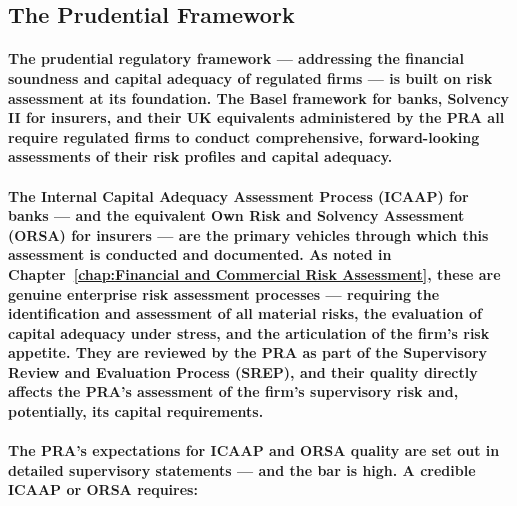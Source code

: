 \subsection{The Prudential Framework}
\paragraph{The \textbf{prudential regulatory framework} — addressing the financial soundness and capital adequacy of regulated firms — is built on risk assessment at its foundation. The Basel framework for banks, Solvency II for insurers, and their UK equivalents administered by the PRA all require regulated firms to conduct comprehensive, forward-looking assessments of their risk profiles and capital adequacy.}
\paragraph{The \textbf{Internal Capital Adequacy Assessment Process (ICAAP)} for banks — and the equivalent \textbf{Own Risk and Solvency Assessment (ORSA)} for insurers — are the primary vehicles through which this assessment is conducted and documented. As noted in Chapter~\ref{chap:Financial and Commercial Risk Assessment}, these are genuine enterprise risk assessment processes — requiring the identification and assessment of all material risks, the evaluation of capital adequacy under stress, and the articulation of the firm's risk appetite. They are reviewed by the PRA as part of the Supervisory Review and Evaluation Process (SREP), and their quality directly affects the PRA's assessment of the firm's supervisory risk and, potentially, its capital requirements.}
\paragraph{The PRA's expectations for ICAAP and ORSA quality are set out in detailed supervisory statements — and the bar is high. A credible ICAAP or ORSA requires:}
\begin{itemize}
\end{itemize}
